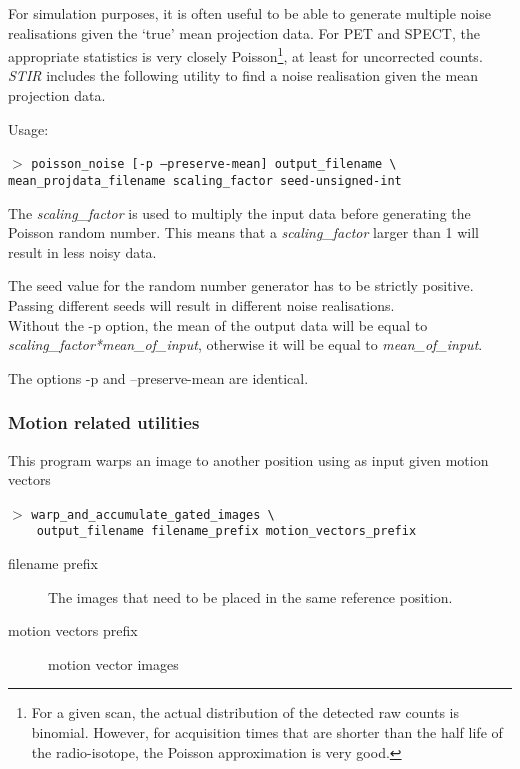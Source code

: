 \documentclass{article}
\newcommand{\cmdline}[1]{\par \noindent $>$ \texttt{#1}\par}
\begin{document}
For simulation purposes, it is often useful to be able to generate 
multiple noise realisations given the `true' mean projection data. 
For PET and SPECT, the appropriate statistics is very closely 
Poisson\footnote{{\small For a given scan, the actual distribution of 
the detected raw counts is binomial. However, for acquisition 
times that are shorter than the half life of the radio-isotope, 
the Poisson approximation is very good.}}, 
at least for uncorrected counts. \textit{STIR} includes the following 
utility to find a noise realisation given the mean projection 
data.


Usage:
\cmdline{poisson\_noise [-p {\textbar} --preserve-mean] output\_filename 
{\textbackslash}\\
mean\_projdata\_filename scaling\_factor seed-unsigned-int}


The \textit{scaling\_factor} is used to multiply the input data before 
generating the Poisson random number. This means that a \textit{scaling\_factor} 
larger than 1 will result in less noisy data.


The seed value for the random number generator has to be strictly 
positive. Passing different seeds will result in different noise 
realisations.\\
Without the -p option, the mean of the output data will be equal 
to \textit{scaling\_factor*mean\_of\_input}, otherwise it will be equal 
to \textit{mean\_of\_input}.


The options -p and --preserve-mean are identical.


\subsubsection{Motion related utilities}
\label{sec:motionRelatedUtilities}
{ 
}

This program warps an image to another position using as input given motion vectors 

{ 
}

\cmdline{warp\_and\_accumulate\_gated\_images \textbackslash \\
\,\,\,\,output\_filename filename\_prefix motion\_vectors\_prefix}

\begin{description}
\item[filename prefix] The images that need to be placed in the
same reference position.

\item[motion vectors prefix]  motion vector images
\end{description}
\end{document}
